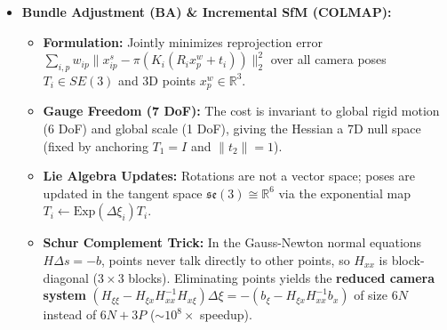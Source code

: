 \documentclass[10pt, a4paper]{article}
\begin{document}
\begin{itemize}
    \begin{itemize}
        \item \textbf{Essential Matrix ($E = [t]_\times R$):} Operates on calibrated rays $\tilde{x}_i = K_i^{-1}\bar{x}_i$ via $\tilde{x}_2^\top E \tilde{x}_1 = 0$. Has \textbf{rank 2}, \textbf{5 DoF} (3 rot + 3 trans $-$ 1 scale), and singular values $(\sigma, \sigma, 0)$. Estimated via the \textbf{normalized 8-point algorithm} (SVD + projecting singular values to $(1,1,0)$) or minimal \textbf{5-point solver} inside RANSAC.
        \item \textbf{4-Fold Decomposition \& Cheirality:} Decomposing $E = U\operatorname{diag}(1,1,0)V^\top$ yields 4 pose candidates: $(U W V^\top$ or $U W^\top V^\top)$ and $t = \pm u_3$ (baseline sign flip + $180^\circ$ twisted pair rotation). Only \textbf{1 solution} puts triangulated points in front of \emph{both} cameras ($z_1 > 0, z_2 > 0$, \textbf{cheirality check}).
        \item \textbf{Fundamental Matrix ($F = K_2^{-\top} E K_1^{-1}$):} Used when intrinsics $K_i$ are unknown ($\bar{x}_2^\top F \bar{x}_1 = 0$); rank 2, \textbf{7 DoF}.
        \item \textbf{Triangulation \& Parallax Trade-off:} Linear DLT ($\bar{x}_i \times P_i \tilde{x}_w = 0$) or nonlinear reprojection minimization. \textbf{Trade-off:} Small baseline/parallax angle $\gamma$ makes feature matching easy, but rays are nearly parallel so depth uncertainty explodes ($\sigma_Z \propto 1/\gamma$); wide baseline gives accurate triangulation but hard matching.
    \end{itemize}
    \item \textbf{Bundle Adjustment (BA) \& Incremental SfM (COLMAP):}
    \begin{itemize}
        \item \textbf{Formulation:} Jointly minimizes reprojection error $\sum_{i,p} w_{ip} \|x_{ip}^s - \pi(K_i(R_i x_p^w + t_i))\|_2^2$ over all camera poses $T_i \in SE(3)$ and 3D points $x_p^w \in \mathbb{R}^3$.
        \item \textbf{Gauge Freedom (7 DoF):} The cost is invariant to global rigid motion (6 DoF) and global scale (1 DoF), giving the Hessian a 7D null space (fixed by anchoring $T_1 = I$ and $\|t_2\|=1$).
        \item \textbf{Lie Algebra Updates:} Rotations are not a vector space; poses are updated in the tangent space $\mathfrak{se}(3) \cong \mathbb{R}^6$ via the exponential map $T_i \leftarrow \text{Exp}(\Delta\xi_i) T_i$.
        \item \textbf{Schur Complement Trick:} In the Gauss-Newton normal equations $H\Delta s = -b$, points never talk directly to other points, so $H_{xx}$ is block-diagonal ($3\times 3$ blocks). Eliminating points yields the \textbf{reduced camera system} $(H_{\xi\xi} - H_{\xi x}H_{xx}^{-1}H_{x\xi})\Delta\xi = -(b_\xi - H_{\xi x}H_{xx}^{-1}b_x)$ of size $6N$ instead of $6N + 3P$ ($\sim 10^8\times$ speedup).

\end{itemize}
\end{itemize}
\end{document}
